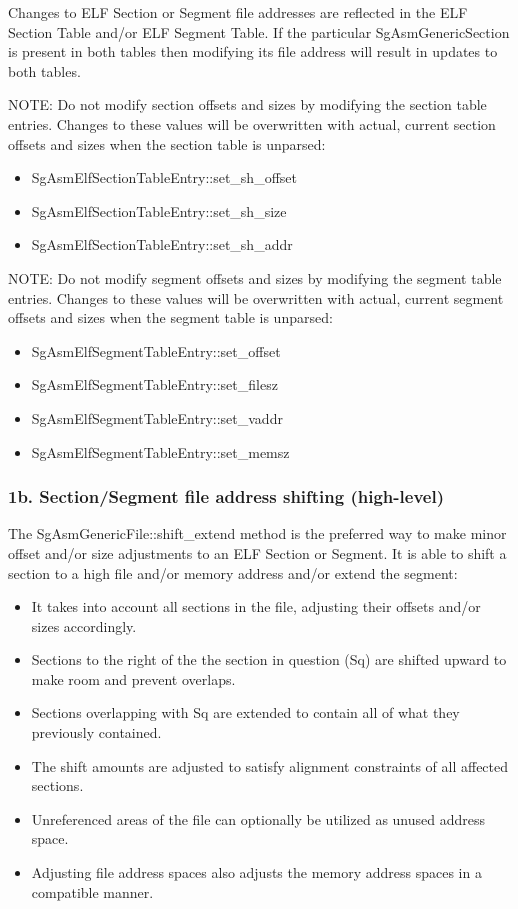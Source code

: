    Changes to ELF Section or Segment file addresses are reflected in the ELF Section Table and/or ELF Segment Table. If the
   particular SgAsmGenericSection is present in both tables then modifying its file address will result in updates to both
   tables.

   NOTE: Do not modify section offsets and sizes by modifying the section table entries. Changes to these values will be
   overwritten with actual, current section offsets and sizes when the section table is unparsed:
\begin{itemize}
	\item SgAsmElfSectionTableEntry::set\_sh\_offset
	\item SgAsmElfSectionTableEntry::set\_sh\_size
	\item SgAsmElfSectionTableEntry::set\_sh\_addr
\end{itemize}

   NOTE: Do not modify segment offsets and sizes by modifying the segment table entries. Changes to these values will be
   overwritten with actual, current segment offsets and sizes when the segment table is unparsed:
\begin{itemize}
   \item SgAsmElfSegmentTableEntry::set\_offset
   \item SgAsmElfSegmentTableEntry::set\_filesz
   \item SgAsmElfSegmentTableEntry::set\_vaddr
   \item SgAsmElfSegmentTableEntry::set\_memsz
\end{itemize}

\subsubsection{1b. Section/Segment file address shifting (high-level)}
   
   The SgAsmGenericFile::shift\_extend method is the preferred way to make minor offset and/or size adjustments to an ELF
   Section or Segment. It is able to shift a section to a high file and/or memory address and/or extend the segment:
\begin{itemize}
   \item It takes into account all sections in the file, adjusting their offsets and/or sizes accordingly.

   \item Sections to the right of the the section in question (Sq) are shifted upward to make room and prevent overlaps.

   \item Sections overlapping with Sq are extended to contain all of what they previously contained.

   \item The shift amounts are adjusted to satisfy alignment constraints of all affected sections.

   \item Unreferenced areas of the file can optionally be utilized as unused address space.

   \item Adjusting file address spaces also adjusts the memory address spaces in a compatible manner.
\end{itemize}

